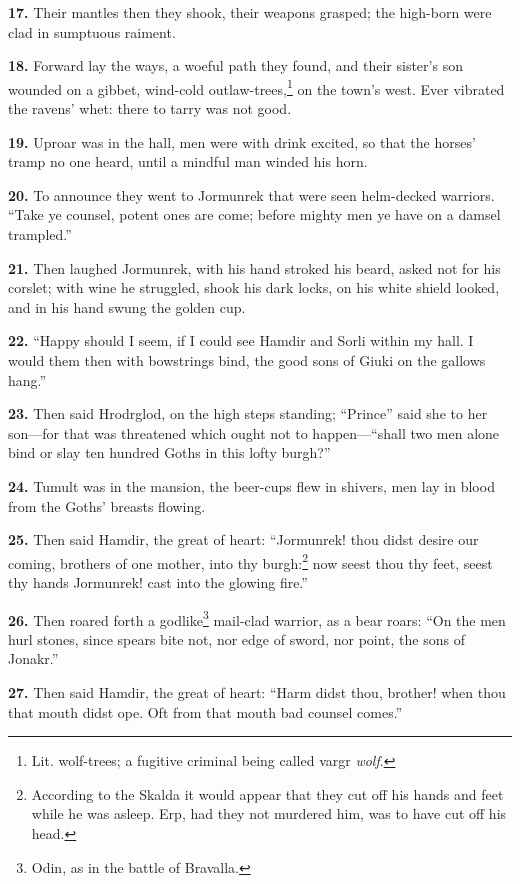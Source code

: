 \textbf{17.} Their mantles then they shook, their weapons grasped; the
high-born were clad in sumptuous raiment.

\textbf{18.} Forward lay the ways, a woeful path they found, and their
sister's son wounded on a gibbet, wind-cold outlaw-trees,\footnote{Lit. wolf-trees; a fugitive criminal being called vargr
\emph{wolf}.} on the
town's west. Ever vibrated the ravens' whet: there to tarry was not
good.

\textbf{19.} Uproar was in the hall, men were with drink excited, so that the
horses' tramp no one heard, until a mindful man winded his horn.

\textbf{20.} To announce they went to Jormunrek that were seen helm-decked
warriors. ``Take ye counsel, potent ones are come; before mighty men ye
have on a damsel trampled.''

\textbf{21.} Then laughed Jormunrek, with his hand stroked his beard, asked
not for his corslet; with wine he struggled, shook his dark locks, on
his white shield looked, and in his hand swung the golden cup.

\textbf{22.} ``Happy should I seem, if I could see Hamdir and Sorli within my
hall. I would them then with bowstrings bind, the good sons of Giuki
on the gallows hang.''

\textbf{23.} Then said Hrodrglod, on the high steps standing; ``Prince'' said
she to her son—for that was threatened which ought not to
happen—``shall two men alone bind or slay ten hundred Goths in this
lofty burgh?''

\textbf{24.} Tumult was in the mansion, the beer-cups flew in shivers, men
lay in blood from the Goths' breasts flowing.

\textbf{25.} Then said Hamdir, the great of heart: ``Jormunrek! thou didst
desire our coming, brothers of one mother, into thy burgh:\footnote{According to the Skalda it would appear that they cut
off his hands and feet while he was asleep. Erp, had they not murdered
him, was to have cut off his head.} now
seest thou thy feet, seest thy hands Jormunrek! cast into the glowing
fire.''

\textbf{26.} Then roared forth a godlike\footnote{Odin, as in the battle of Bravalla.} mail-clad warrior, as a bear
roars: ``On the men hurl stones, since spears bite not, nor edge of
sword, nor point, the sons of Jonakr.''

\textbf{27.} Then said Hamdir, the great of heart: ``Harm didst thou, brother!
when thou that mouth didst ope. Oft from that mouth bad counsel
comes.''

